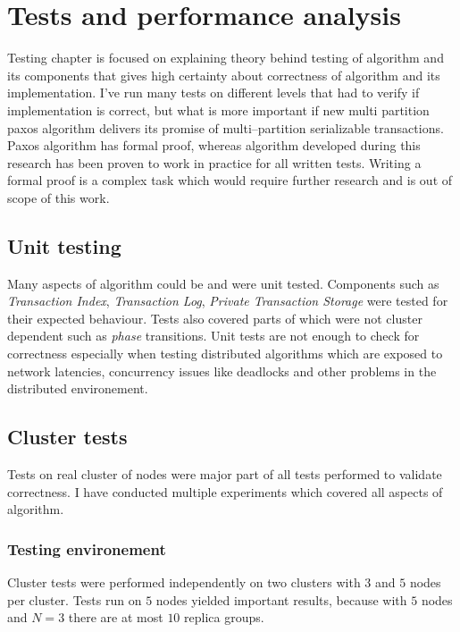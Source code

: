 
\chapter{Tests and performance analysis}\label{chapter:testing}

Testing chapter is focused on explaining theory behind testing of \mpp algorithm and its components that gives high certainty about correctness of algorithm and its implementation. I’ve run many tests on different levels that had to verify if implementation is correct, but what is more important if new multi partition paxos algorithm delivers its promise of multi--partition serializable transactions. 
Paxos algorithm has formal proof, whereas \mpp algorithm developed during this research has been proven to work in practice for all written tests. Writing a formal proof is a complex task which would require further research and is out of scope of this work.

\section{Unit testing}
Many aspects of algorithm could be and were unit tested. Components such as \emph{Transaction Index}, \emph{Transaction Log}, \emph{Private Transaction Storage} were  tested for their expected behaviour. Tests also covered parts of \mpp which were not cluster dependent such as \emph{phase} transitions. Unit tests are not enough to check for correctness especially when testing distributed algorithms which are  exposed to network latencies, concurrency issues like deadlocks and other problems in the distributed environement. 

\section{Cluster tests}
Tests on real cluster of nodes were major part of all tests performed to validate \mpp correctness. I have conducted multiple experiments which covered all aspects of \mpp algorithm. 

\subsection{Testing environement}
Cluster tests were performed independently on two clusters with $3$ and $5$ nodes per cluster. Tests run on $5$ nodes yielded important results, because with $5$ nodes and $N=3$ there are at most $10$ replica groups. 


